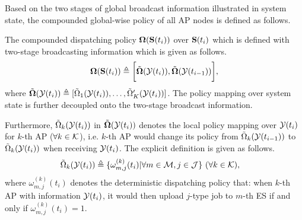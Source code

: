         
Based on the two stages of global broadcast information illustrated in system state, the compounded global-wise policy of all AP nodes is defined as follows.
\begin{definition}
    The compounded dispatching policy $\boldsymbol{\Omega}(\mathbf{S}(t_{i}))$ over $\mathbf{S}(t_{i})$ which is defined with two-stage broadcasting information which is given as follows.
    \begin{align}
        \boldsymbol{\Omega}(\mathbf{S}(t_{i})) \triangleq \bigg[
            \tilde{\boldsymbol{\Omega}}(\mathcal{Y}(t_{i})), \tilde{\boldsymbol{\Omega}}(\mathcal{Y}(t_{i-1}))
        \bigg],
    \end{align}
    where
    $\tilde{\boldsymbol{\Omega}}(\mathcal{Y}(t_{i})) \triangleq [\tilde{\Omega}_{1}(\mathcal{Y}(t_{i})), \dots, \tilde{\Omega}'_{K}(\mathcal{Y}(t_{i}))]$.
    The policy mapping over system state is further decoupled onto the two-stage broadcast information.

    Furthermore,
    $\tilde{\Omega}_{k}(\mathcal{Y}(t_{i}))$ in $\tilde{\boldsymbol{\Omega}}(\mathcal{Y}(t_{i}))$
    denotes the local policy mapping over $\mathcal{Y}(t_{i})$ for $k$-th AP ($\forall k\in\mathcal{K}$), i.e. $k$-th AP would change its policy from $\tilde{\Omega}_{k}(\mathcal{Y}(t_{i-1}))$ to $\tilde{\Omega}_{k}(\mathcal{Y}(t_{i}))$ when receiving $\mathcal{Y}(t_{i})$.
    The explicit definition is given as follows.
    \begin{align}
        &\tilde{\Omega}_{k}(\mathcal{Y}(t_{i})) \triangleq \{\omega^{(k)}_{m,j}(t_{i})|\forall m\in\mathcal{M}, j\in\mathcal{J}\}
        ~(\forall k\in\mathcal{K}),
    \end{align}
    where $\omega^{(k)}_{m,j}(t_{i})$ denotes the deterministic dispatching policy that: when $k$-th AP with information $\mathcal{Y}(t_{i})$, it would then upload $j$-type job to $m$-th ES if and only if $\omega^{(k)}_{m,j}(t_{i})=1$.
\end{definition}

